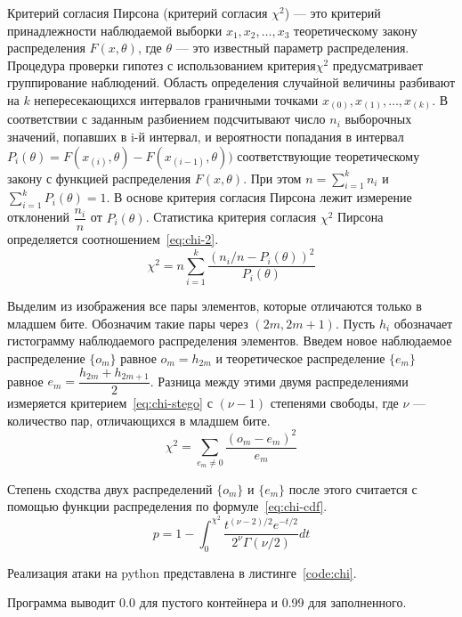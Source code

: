 Критерий согласия Пирсона (критерий согласия $\chi^2$) --- это критерий принадлежности наблюдаемой
выборки $x_1, x_2, \dots , x_3$ теоретическому закону распределения $F(x, \theta)$,
где $\theta$ --- это известный параметр распределения.
Процедура проверки гипотез с использованием критерия$\chi^2$ предусматривает группирование наблюдений.
Область определения случайной величины разбивают на $k$
непересекающихся интервалов граничными точками
$x_{(0)}, x_{(1)}, \dots, x_{(k)}$.
В соответствии с заданным разбиением подсчитывают число $n_i$ выборочных значений,
попавших в i-й интервал, и вероятности попадания в интервал
$P_i(\theta) = F(x_{(i)}, \theta) - F(x_{(i - 1)}, \theta))$
соответствующие теоретическому закону с функцией распределения $F(x, \theta)$.
При этом $n = \sum_{i = 1}^{k} n_i$ и $\sum_{i = 1}^{k} P_i(\theta) = 1$.
В основе критерия согласия Пирсона лежит измерение отклонений
$\dfrac{n_i}{n}$ от $P_i(\theta)$.
Статистика критерия согласия $\chi^2$ Пирсона определяется соотношением~\ref{eq:chi-2}.
\begin{equation}
    \label{eq:chi-2}
    \chi^2 = n \sum_{i=1}^k \dfrac{(n_i / n - P_i(\theta))^2}{P_i(\theta)}
\end{equation}

Выделим из изображения все пары элементов, которые отличаются только в младшем бите.
Обозначим такие пары через $(2m, 2m + 1)$. Пусть $h_i$ обозначает гистограмму наблюдаемого
распределения элементов.
Введем новое наблюдаемое распределение $\{o_m\}$ равное $o_m = h_{2m}$
и теоретическое распределение $\{e_m\}$ равное $e_m = \dfrac{h_{2m} + h_{2m + 1}}{2}$.
Разница между этими двумя распределениями измеряется критерием~\ref{eq:chi-stego}
с $(\nu - 1)$ степенями свободы, где $\nu$ --- количество пар, отличающихся в младшем бите.
\begin{equation}
    \label{eq:chi-stego}
    \chi^2 = \sum_{e_m \neq 0} \dfrac{(o_m - e_m) ^ 2}{e_m}
\end{equation}

Степень сходства двух распределений $\{o_m\}$ и $\{e_m\}$ после этого считается
с помощью функции распределения по формуле~\ref{eq:chi-cdf}.
\begin{equation}
    \label{eq:chi-cdf}
    p = 1 - \int_{0}^{\chi^2} \dfrac{t^{(\nu - 2)/2}e^{-t/2}}{2^\nu\Gamma(\nu/2)}dt
\end{equation}

Реализация атаки на python представлена в листинге~\ref{code:chi}.

Программа выводит 0.0 для пустого контейнера и 0.99 для заполненного.

